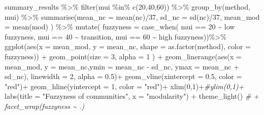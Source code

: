 \documentclass[
]{article}
\newenvironment{Shaded}{\begin{snugshade}}{\end{snugshade}}
\newcommand{\AttributeTok}[1]{\textcolor[rgb]{0.77,0.63,0.00}{#1}}
\newcommand{\CommentTok}[1]{\textcolor[rgb]{0.56,0.35,0.01}{\textit{#1}}}
\newcommand{\DecValTok}[1]{\textcolor[rgb]{0.00,0.00,0.81}{#1}}
\newcommand{\FloatTok}[1]{\textcolor[rgb]{0.00,0.00,0.81}{#1}}
\newcommand{\FunctionTok}[1]{\textcolor[rgb]{0.00,0.00,0.00}{#1}}
\newcommand{\NormalTok}[1]{#1}
\newcommand{\SpecialCharTok}[1]{\textcolor[rgb]{0.00,0.00,0.00}{#1}}
\newcommand{\StringTok}[1]{\textcolor[rgb]{0.31,0.60,0.02}{#1}}
\begin{document}
\newpage

\begin{Shaded}
\begin{Highlighting}[]
\NormalTok{summary\_results }\SpecialCharTok{\%\textgreater{}\%} 
  \FunctionTok{filter}\NormalTok{(mui }\SpecialCharTok{\%in\%} \FunctionTok{c}\NormalTok{(}\DecValTok{20}\NormalTok{,}\DecValTok{40}\NormalTok{,}\DecValTok{60}\NormalTok{)) }\SpecialCharTok{\%\textgreater{}\%} 
  \FunctionTok{group\_by}\NormalTok{(method, mui) }\SpecialCharTok{\%\textgreater{}\%} 
    \FunctionTok{summarise}\NormalTok{(}\AttributeTok{mean\_nc =} \FunctionTok{mean}\NormalTok{(nc)}\SpecialCharTok{/}\DecValTok{37}\NormalTok{, }\AttributeTok{sd\_nc =} \FunctionTok{sd}\NormalTok{(nc)}\SpecialCharTok{/}\DecValTok{37}\NormalTok{, }
              \AttributeTok{mean\_mod =} \FunctionTok{mean}\NormalTok{(mod)  ) }\SpecialCharTok{\%\textgreater{}\%}
  \FunctionTok{mutate}\NormalTok{( }\AttributeTok{fuzzyness =} \FunctionTok{case\_when}\NormalTok{(}
\NormalTok{    mui }\SpecialCharTok{==} \DecValTok{20} \SpecialCharTok{\textasciitilde{}} \StringTok{\textquotesingle{}  low fuzzyness\textquotesingle{}}\NormalTok{,}
\NormalTok{    mui }\SpecialCharTok{==} \DecValTok{40} \SpecialCharTok{\textasciitilde{}} \StringTok{\textquotesingle{} transition\textquotesingle{}}\NormalTok{,}
\NormalTok{    mui }\SpecialCharTok{==} \DecValTok{60} \SpecialCharTok{\textasciitilde{}} \StringTok{\textquotesingle{}high fuzzyness\textquotesingle{}}\NormalTok{))}\SpecialCharTok{\%\textgreater{}\%}
  \FunctionTok{ggplot}\NormalTok{(}\FunctionTok{aes}\NormalTok{(}\AttributeTok{x =}\NormalTok{ mean\_mod, }\AttributeTok{y =}\NormalTok{ mean\_nc, }\AttributeTok{shape =} \FunctionTok{as.factor}\NormalTok{(method), }\AttributeTok{color =}\NormalTok{ fuzzyness)) }\SpecialCharTok{+}
  \FunctionTok{geom\_point}\NormalTok{(}\AttributeTok{size =} \DecValTok{3}\NormalTok{, }\AttributeTok{alpha =} \DecValTok{1}\NormalTok{ ) }\SpecialCharTok{+}
  \FunctionTok{geom\_linerange}\NormalTok{(}\FunctionTok{aes}\NormalTok{(}\AttributeTok{x =}\NormalTok{ mean\_mod, }\AttributeTok{y =}\NormalTok{ mean\_nc,}\AttributeTok{ymin =}\NormalTok{ mean\_nc }\SpecialCharTok{{-}}\NormalTok{ sd\_nc, }\AttributeTok{ymax =}\NormalTok{ mean\_nc }\SpecialCharTok{+}\NormalTok{ sd\_nc), }
                 \AttributeTok{linewidth =} \DecValTok{2}\NormalTok{, }\AttributeTok{alpha =} \FloatTok{0.5}\NormalTok{)}\SpecialCharTok{+}
  \FunctionTok{geom\_vline}\NormalTok{(}\AttributeTok{xintercept =} \FloatTok{0.5}\NormalTok{, }\AttributeTok{color =} \StringTok{"red"}\NormalTok{)}\SpecialCharTok{+}
  \FunctionTok{geom\_hline}\NormalTok{(}\AttributeTok{yintercept =} \DecValTok{1}\NormalTok{, }\AttributeTok{color =} \StringTok{"red"}\NormalTok{)}\SpecialCharTok{+}
  \FunctionTok{xlim}\NormalTok{(}\DecValTok{0}\NormalTok{,}\DecValTok{1}\NormalTok{)}\SpecialCharTok{+}\CommentTok{\#ylim(0,1)+}
  \FunctionTok{labs}\NormalTok{(}\AttributeTok{title =} \StringTok{"Fuzzyness of communities"}\NormalTok{, }\AttributeTok{x =} \StringTok{"modularity"}\NormalTok{) }\SpecialCharTok{+}
  \FunctionTok{theme\_light}\NormalTok{() }\CommentTok{\# + facet\_wrap(fuzzyness \textasciitilde{} .)}
\end{Highlighting}
\end{Shaded}
\end{document}
